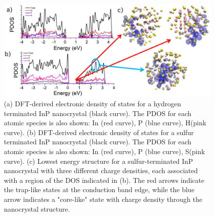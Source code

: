 \begin{figure}
\begin{center}
\includegraphics[width=\textwidth]{./Chapter5/inp2.jpeg}
\caption[DFT-dervied electronic structure of H- and S-passivated InP NCs.]{(a) DFT-derived electronic density of states for a hydrogen terminated InP nanocrystal (black curve). The PDOS for each atomic species is also shown: In (red curve), P (blue curve), H(pink curve). (b) DFT-derived electronic density of states for a sulfur terminated InP nanocrystal (black curve). The PDOS for each atomic species is also shown: In (red curve), P (blue curve), S(pink curve). (c) Lowest energy structure for a sulfur-terminated InP nanocrystal with three different charge densities, each associated with a region of the DOS indicated in (b). The red arrows indicate the trap-like states at the conduction band edge, while the blue arrow indicates a "core-like" state with charge density through the nanocrystal structure.}
\label{f:inp2}
\end{center}
\end{figure}

